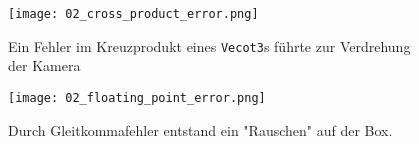 \documentclass[tog]{acmsiggraph}
\newcommand{\code}[1]{\texttt{#1}}
\begin{document}
\begin{figure}[ht]
  \centering
	\texttt{[image: 02\_cross\_product\_error.png]}
	\caption{Ein Fehler im Kreuzprodukt eines \code{Vecot3}s führte zur Verdrehung der Kamera}
  \label{fig:cross_product_error}
\end{figure}

\begin{figure}[ht]
  \centering
	\texttt{[image: 02\_floating\_point\_error.png]}
	\caption{Durch Gleitkommafehler entstand ein "Rauschen" auf der Box.}
  \label{fig:implicit_plane}
\end{figure}
\end{document}
